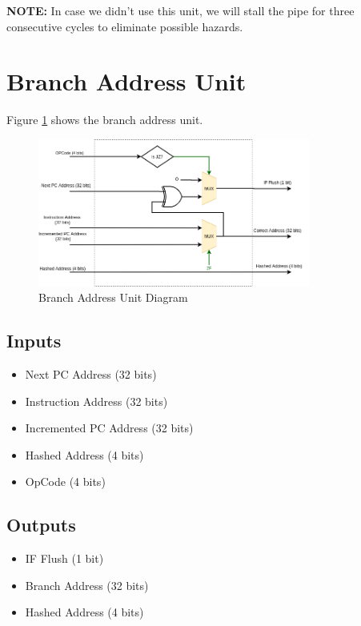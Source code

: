 \documentclass[12pt]{report}
\begin{document}
\textbf{NOTE:} In case we didn't use this unit, we will stall the pipe for three consecutive cycles to eliminate possible hazards.

\section{Branch Address Unit}
Figure \ref{fig:bau} shows the branch address unit.
\begin{center}
    \begin{figure}[hp]
        \centering
        \includegraphics[width=0.8\textwidth]{bau}
        \caption{Branch Address Unit Diagram}
        \label{fig:bau}
    \end{figure}
\end{center}

\subsection{Inputs}
\begin{itemize}
    \item Next PC Address (32 bits)
    \item Instruction Address (32 bits)
    \item Incremented PC Address (32 bits)
    \item Hashed Address (4 bits)
    \item OpCode (4 bits)
\end{itemize}

\subsection{Outputs}
\begin{itemize}
    \item IF Flush (1 bit)
    \item Branch Address (32 bits)
    \item Hashed Address (4 bits)
\end{itemize}
\end{document}
